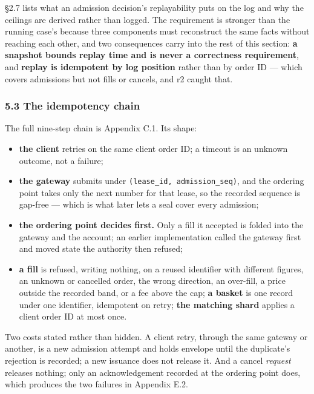 \documentclass[10pt,a4paper]{article}
\providecommand{\tightlist}{\setlength{\itemsep}{0pt}\setlength{\parskip}{0pt}}
\begin{document}
§2.7 lists what an admission decision's replayability puts on the log and why the
ceilings are derived rather than logged. The requirement is stronger than the
running case's because three components must reconstruct the same facts without
reaching each other, and two consequences carry into the rest of this section:
\textbf{a snapshot bounds replay time and is never a correctness requirement}, and
\textbf{replay is idempotent by log position} rather than by order ID --- which covers
admissions but not fills or cancels, and r2 caught that.

\subsubsection{5.3 The idempotency chain}\label{the-idempotency-chain}

The full nine-step chain is Appendix C.1. Its shape:

\begin{itemize}
\tightlist
\item
  \textbf{the client} retries on the same client order ID; a timeout is an unknown
  outcome, not a failure;
\item
  \textbf{the gateway} submits under \texttt{(lease\_id,\ admission\_seq)}, and the ordering
  point takes only the next number for that lease, so the recorded sequence is
  gap-free --- which is what later lets a seal cover every admission;
\item
  \textbf{the ordering point decides first.} Only a fill it accepted is folded into
  the gateway and the account; an earlier implementation called the gateway first
  and moved state the authority then refused;
\item
  \textbf{a fill} is refused, writing nothing, on a reused identifier with different
  figures, an unknown or cancelled order, the wrong direction, an over-fill, a
  price outside the recorded band, or a fee above the cap; \textbf{a basket} is one
  record under one identifier, idempotent on retry; \textbf{the matching shard}
  applies a client order ID at most once.
\end{itemize}

Two costs stated rather than hidden. A client retry, through the same gateway or
another, is a new admission attempt and holds envelope until the duplicate's
rejection is recorded; a new issuance does not release it. And a cancel \emph{request} releases nothing; only an acknowledgement
recorded at the ordering point does, which produces the two failures in Appendix E.2.
\end{document}
